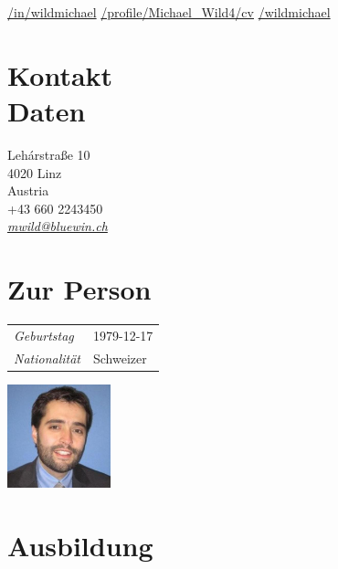 \documentclass[line,11pt,a4paper]{../resume}
\newcommand{\mail}[1]{\textsl{\href{mailto:#1}{#1}}}
\begin{document}
\begin{resume}
\vspace{-4mm}
\-\hspace{-12.3mm}\begin{minipage}{15cm}
\href{https://linkedin.com/in/wildmichael}{\faLinkedinSquare/in/wildmichael}\quad
\href{https://xing.com/profile/Michael_Wild4/cv}{\faXingSquare/profile/Michael\_Wild4/cv}\quad
\href{https://github.com/wildmichael}{\faGithubSquare/wildmichael}
\end{minipage}


\begin{multicols}{3}

\section{\mysidestyle Kontakt\\Daten}\vspace{0.9mm}

Leh\'{a}rstra{\ss}e 10 \\
4020 Linz \\
Austria \\
+43 660 2243450 \\
\mail{mwild@bluewin.ch}\\

\columnbreak

\section{\mysidestyle Zur Person}\vspace{2mm}

\begin{tabular}{@{}ll}
\textsl{Geburtstag} & 1979-12-17 \\
\textsl{Nationalität}   & Schweizer
\end{tabular}

\columnbreak
\vspace*{-9mm}\hfill\includegraphics[width=30mm]{../mwild}

\end{multicols}

\section{\mysidestyle Ausbildung}\vspace{2mm}


\end{resume}
\end{document}
